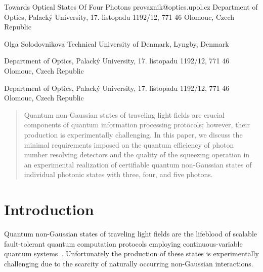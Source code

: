 \documentclass{article}
\begin{document}
\ArticleTitle
  {Towards Optical States Of Four Photons}
  {provaznik@optics.upol.cz}
\ArticleAuthorAddress
  {Department of Optics, Palack\'{y} University, 17. listopadu 1192/12, 771 46 Olomouc, Czech Republic}

\ArticleAuthor
  {Olga Solodovnikova}
\ArticleAuthorAddress
  {Technical University of Denmark, Lyngby, Denmark}

\ArticleAuthorAddress
  {Department of Optics, Palack\'{y} University, 17. listopadu 1192/12, 771 46 Olomouc, Czech Republic}

\ArticleAuthorAddress
  {Department of Optics, Palack\'{y} University, 17. listopadu 1192/12, 771 46 Olomouc, Czech Republic}

\ArticleTitlePrint

\begin{abstract}\noindent
  Quantum non-Gaussian states of traveling light fields are crucial components of quantum information processing protocols; however, their production is experimentally challenging. In this paper, we discuss the minimal requirements imposed on the quantum efficiency of photon number resolving detectors and the quality of the squeezing operation in an experimental realization of certifiable quantum non-Gaussian states of individual photonic states with three, four, and five photons.
\end{abstract}

%

\section{Introduction}

Quantum non-Gaussian states of traveling light fields are the lifeblood of scalable fault-tolerant quantum computation protocols employing continuous-variable quantum systems~\cite{lloyd1999,gottesman2001,menicucci2014,baragiola2019,bourassa2021,madsen2022,aghaeerad2025}. Unfortunately the production of these states is experimentally challenging due to the scarcity of naturally occurring non-Gaussian interactions.
\end{document}

